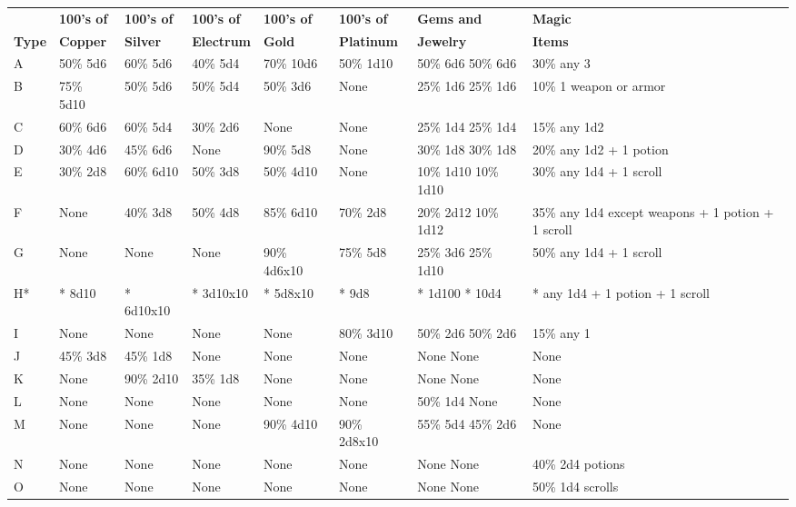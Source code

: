 \documentclass[a4paper,twoside,openany,10pt]{book}
\begin{document}
\begin{tabularx}{1\textwidth}{@{}lXXXXXXX@{}}
&\textbf{100's of}&\textbf{100's of}&\textbf{100's of}&\textbf{100's of}&\textbf{100's of}&\textbf{Gems and}&\textbf{Magic}\\
\textbf{Type} & \textbf{Copper} & \textbf{Silver} & \textbf{Electrum} & \textbf{Gold} & \textbf{Platinum} & \textbf{Jewelry} & \textbf{Items} \\\hline
A & 50\% 5d6 & 60\% 5d6 &  40\% 5d4 & 70\% 10d6 & 50\% 1d10 & 50\% 6d6 50\% 6d6 &  30\% any 3  \\\toprule
B &  75\% 5d10  &  50\% 5d6  &  50\% 5d4  &  50\% 3d6  &  None  &  25\% 1d6    25\% 1d6  &  10\% 1 weapon or armor  \\\hline
C &  60\% 6d6  &  60\% 5d4  &  30\% 2d6  &  None  &  None  &  25\% 1d4    25\% 1d4  &  15\% any 1d2  \\ \hline
D &  30\% 4d6  &  45\% 6d6  &  None  &  90\% 5d8  &  None  &  30\% 1d8    30\% 1d8  &  20\% any 1d2    + 1 potion  \\\hline
E &  30\% 2d8  &  60\% 6d10  &  50\% 3d8  &  50\% 4d10  &  None  &  10\% 1d10    10\% 1d10  &  30\% any 1d4    + 1 scroll  \\\hline
F &  None  &  40\% 3d8  &  50\% 4d8  &  85\% 6d10  &  70\% 2d8  &  20\% 2d12    10\% 1d12  &  35\% any 1d4 except weapons + 1 potion + 1 scroll \\\hline
G & None & None & None & 90\% 4d6x10 & 75\% 5d8 & 25\% 3d6 25\% 1d10  &  50\% any 1d4  + 1 scroll \\\hline
H* &  * 8d10  &  * 6d10x10  &  * 3d10x10  &  * 5d8x10  &  * 9d8  &  * 1d100    * 10d4  &  * any 1d4  + 1 potion + 1 scroll \\\hline
I &  None & None  &  None  &  None  &  80\% 3d10  &  50\% 2d6  50\% 2d6  &  15\% any 1  \\\hline
J &  45\% 3d8  &  45\% 1d8  &  None  &  None  &  None  & None None  & None \\\hline
K &  None &  90\% 2d10  &  35\% 1d8  &  None  &  None  &  None None  & None \\\hline
L &  None  &  None  &  None   &  None  &  None  &  50\% 1d4 None  & None \\\hline
M &  None  &  None  &  None  &  90\% 4d10  &  90\% 2d8x10  &  55\% 5d4  45\% 2d6  & None \\\hline
N &  None  &  None  &  None  &  None  &  None  &  None  None  &  40\% 2d4 potions \\\hline
O & None &   None  &  None &  None &  None  & None None  & 50\% 1d4 scrolls  \\\bottomrule
\end{tabularx}
\end{document}
